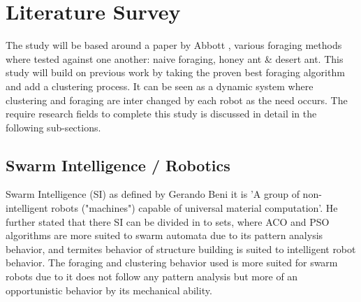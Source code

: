 \documentclass[12pt]{article}
\begin{document}
\section{Literature Survey}
\par{The study will be based around a paper by Abbott \cite{Jade-2014}, various foraging methods where tested against one another: naive foraging, honey ant \& desert ant. This study will build on previous work by taking the proven best foraging algorithm and add a clustering process. It can be seen as a dynamic system where clustering and foraging are inter changed by each robot as the need occurs. The require research fields to complete this study is discussed in detail in the following sub-sections.}

\subsection{Swarm Intelligence / Robotics}
\par{Swarm Intelligence (SI) as defined by Gerando Beni \cite{Beni-Robot} it is 'A group of non-intelligent robots ("machines") capable of universal material computation'. He further stated that there SI can be divided in to sets, where ACO and PSO algorithms are more suited to swarm automata due to its pattern analysis behavior, and termites behavior of structure building is suited to intelligent robot behavior. The foraging and clustering behavior used is more suited for swarm robots due to it does not follow any pattern analysis but more of an opportunistic behavior by its mechanical ability.}
\\
\end{document}
